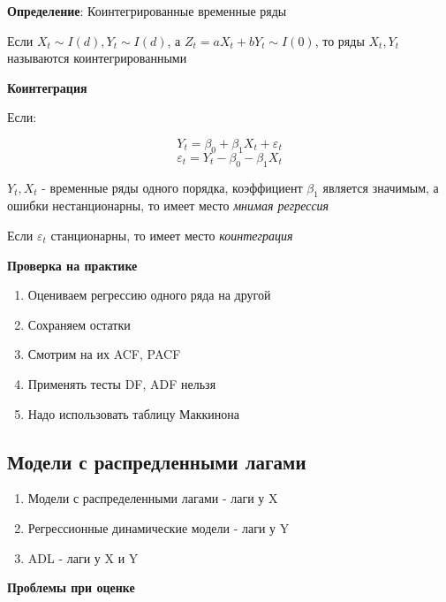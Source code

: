 \documentclass[a4paper, 12pt]{article}
\begin{document}
\textbf{Определение}: Коинтегрированные временные ряды

\begin{center}
    Если $X_t \sim I(d), Y_t \sim I(d)$, а $Z_t = aX_t + bY_t \sim I(0)$, то ряды $X_t, Y_t$ называются коинтегрированными
\end{center}

\textbf{Коинтеграция}

Если:

\[Y_t = \beta_0 + \beta_1 X_t + \varepsilon_t\]
\[\varepsilon_t = Y_t - \beta_0 - \beta_1 X_t\]

$Y_t, X_t$ - временные ряды одного порядка, коэффициент $\beta_1$ является значимым, а ошибки нестанционарны, то имеет место \textit{мнимая регрессия}

Если $\varepsilon_t$ станционарны, то имеет место \textit{коинтеграция}

\textbf{Проверка на практике}

\begin{enumerate}
    \item Оцениваем регрессию одного ряда на другой
    \item Сохраняем остатки
    \item Смотрим на их ACF, PACF
    \item Применять тесты DF, ADF нельзя
    \item Надо использовать таблицу Маккинона
\end{enumerate}

\subsection{Модели с распредленными лагами}

\begin{enumerate}
    \item Модели с распределенными лагами - лаги у X
    \item Регрессионные динамические модели - лаги у Y
    \item ADL - лаги у X и Y
\end{enumerate}

\textbf{Проблемы при оценке}
\end{document}
